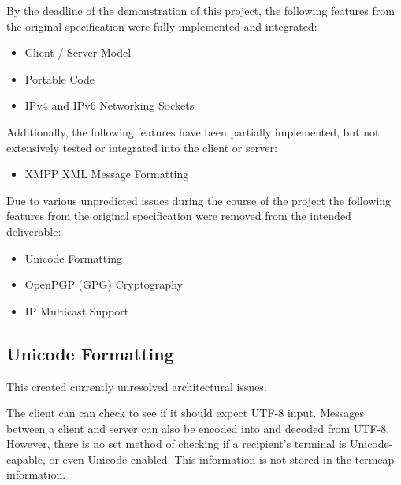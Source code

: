 
By the deadline of the demonstration of this project, the following
features from the original specification were fully implemented and
integrated:

\begin{itemize}

\item Client / Server Model

\item Portable Code

\item IPv4 and IPv6 Networking Sockets

\end{itemize}

Additionally, the following features have been partially implemented,
but not extensively tested or integrated into the client or server:

\begin{itemize}

\item XMPP XML Message Formatting

\end{itemize}


Due to various unpredicted issues during the course of the project the
following features from the original specification were removed from the
intended deliverable:

\begin{itemize}

\item Unicode Formatting

\item OpenPGP (GPG) Cryptography

\item IP Multicast Support

\end{itemize}


\subsection{Unicode Formatting}

This created currently unresolved architectural issues. 


The client can can check to see if it should expect UTF-8 input. 
Messages between a client and server can also be encoded into and
decoded from UTF-8. However, there is no set method of checking if a
recipient's terminal is Unicode-capable, or even Unicode-enabled. This
information is not stored in the termcap information.


